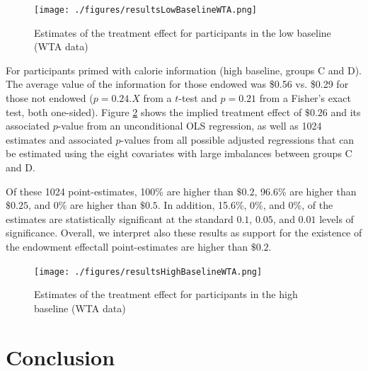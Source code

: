 \documentclass[12pt]{article}
\begin{document}

\begin{figure}[ht]
  \caption{Estimates of the treatment effect for participants in the low baseline (WTA data)}\label{fig:resultsLowBaselineWTA}
  \begin{center}
  {\texttt{[image: ./figures/resultsLowBaselineWTA.png]}}
  \end{center}
\end{figure}

For participants primed with calorie information (high baseline, groups C and D). The average value of the information for those endowed was \$0.56 vs. \$0.29 for those not endowed ($p=0.24.X$ from a $t$-test and $p=0.21$ from a Fisher's exact test, both one-sided). Figure \ref{fig:resultsHighBaselineWTA} shows the implied treatment effect of $\$0.26$ and its associated $p$-value from an unconditional OLS regression, as well as 1024 estimates and associated $p$-values from all possible adjusted regressions that can be estimated using the eight covariates with large imbalances between groups C and D.

Of these 1024 point-estimates, 100\% are higher than $\$0.2$, 96.6\% are higher than $\$0.25$, and 0\% are higher than $\$0.5$. In addition, 15.6\%, 0\%, and 0\%, of the estimates are statistically significant at the standard $0.1$, $0.05$, and $0.01$ levels of significance. Overall, we interpret also these results as support for the existence of the endowment effect\textemdash all point-estimates are higher than $\$0.2$.

\begin{figure}[ht]
  \caption{Estimates of the treatment effect for participants in the high baseline (WTA data)}\label{fig:resultsHighBaselineWTA}
  \begin{center}
  {\texttt{[image: ./figures/resultsHighBaselineWTA.png]}}
  \end{center}
\end{figure}


\section{Conclusion}
\end{document}
